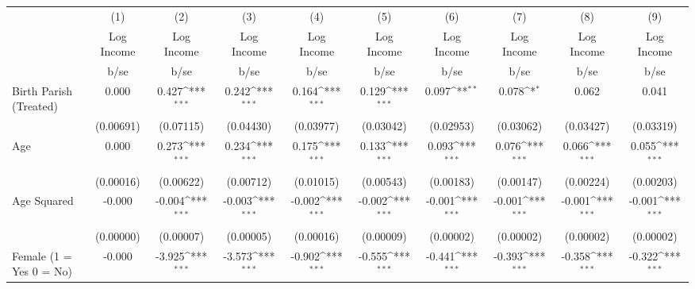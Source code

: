 {
\def\sym#1{\ifmmode^{#1}\else\(^{#1}\)\fi}
\begin{tabular}{l*{9}{c}}
\hline\hline
                    &\multicolumn{1}{c}{(1)}&\multicolumn{1}{c}{(2)}&\multicolumn{1}{c}{(3)}&\multicolumn{1}{c}{(4)}&\multicolumn{1}{c}{(5)}&\multicolumn{1}{c}{(6)}&\multicolumn{1}{c}{(7)}&\multicolumn{1}{c}{(8)}&\multicolumn{1}{c}{(9)}\\
                    &\multicolumn{1}{c}{Log Income}&\multicolumn{1}{c}{Log Income}&\multicolumn{1}{c}{Log Income}&\multicolumn{1}{c}{Log Income}&\multicolumn{1}{c}{Log Income}&\multicolumn{1}{c}{Log Income}&\multicolumn{1}{c}{Log Income}&\multicolumn{1}{c}{Log Income}&\multicolumn{1}{c}{Log Income}\\
                    &        b/se         &        b/se         &        b/se         &        b/se         &        b/se         &        b/se         &        b/se         &        b/se         &        b/se         \\
\hline
Birth Parish (Treated)&       0.000         &       0.427\sym{***}&       0.242\sym{***}&       0.164\sym{***}&       0.129\sym{***}&       0.097\sym{**} &       0.078\sym{*}  &       0.062         &       0.041         \\
                    &   (0.00691)         &   (0.07115)         &   (0.04430)         &   (0.03977)         &   (0.03042)         &   (0.02953)         &   (0.03062)         &   (0.03427)         &   (0.03319)         \\
Age                 &       0.000         &       0.273\sym{***}&       0.234\sym{***}&       0.175\sym{***}&       0.133\sym{***}&       0.093\sym{***}&       0.076\sym{***}&       0.066\sym{***}&       0.055\sym{***}\\
                    &   (0.00016)         &   (0.00622)         &   (0.00712)         &   (0.01015)         &   (0.00543)         &   (0.00183)         &   (0.00147)         &   (0.00224)         &   (0.00203)         \\
Age Squared         &      -0.000         &      -0.004\sym{***}&      -0.003\sym{***}&      -0.002\sym{***}&      -0.002\sym{***}&      -0.001\sym{***}&      -0.001\sym{***}&      -0.001\sym{***}&      -0.001\sym{***}\\
                    &   (0.00000)         &   (0.00007)         &   (0.00005)         &   (0.00016)         &   (0.00009)         &   (0.00002)         &   (0.00002)         &   (0.00002)         &   (0.00002)         \\
Female (1 = Yes 0 = No)&      -0.000         &      -3.925\sym{***}&      -3.573\sym{***}&      -0.902\sym{***}&      -0.555\sym{***}&      -0.441\sym{***}&      -0.393\sym{***}&      -0.358\sym{***}&      -0.322\sym{***}\\

\end{tabular}}
